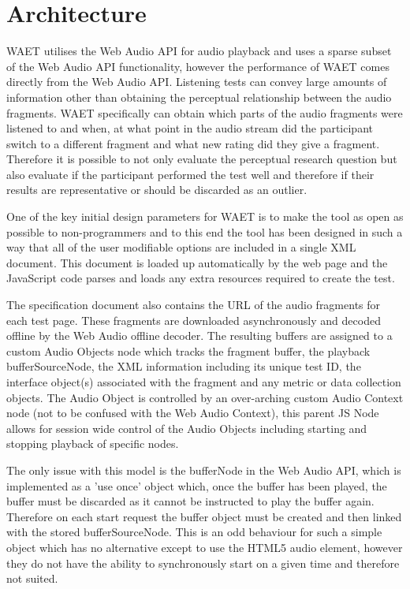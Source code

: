 \documentclass{sig-alternate}
\begin{document}
\section{Architecture}  %
    WAET utilises the Web Audio API for audio playback and uses a sparse subset of the Web Audio API functionality, however the performance of WAET comes directly from the Web Audio API. Listening tests can convey large amounts of information other than obtaining the perceptual relationship between the audio fragments. WAET specifically can obtain which parts of the audio fragments were listened to and when, at what point in the audio stream did the participant switch to a different fragment and what new rating did they give a fragment. Therefore it is possible to not only evaluate the perceptual research question but also evaluate if the participant performed the test well and therefore if their results are representative or should be discarded as an outlier.
    
    One of the key initial design parameters for WAET is to make the tool as open as possible to non-programmers and to this end the tool has been designed in such a way that all of the user modifiable options are included in a single XML document. This document is loaded up automatically by the web page and the JavaScript code parses and loads any extra resources required to create the test.
    
    The specification document also contains the URL of the audio fragments for each test page. These fragments are downloaded asynchronously and decoded offline by the Web Audio offline decoder. The resulting buffers are assigned to a custom Audio Objects node which tracks the fragment buffer, the playback bufferSourceNode, the XML information including its unique test ID, the interface object(s) associated with the fragment and any metric or data collection objects. The Audio Object is controlled by an over-arching custom Audio Context node (not to be confused with the Web Audio Context), this parent JS Node allows for session wide control of the Audio Objects including starting and stopping playback of specific nodes.
    
    The only issue with this model is the bufferNode in the Web Audio API, which is implemented as a 'use once' object which, once the buffer has been played, the buffer must be discarded as it cannot be instructed to play the buffer again. Therefore on each start request the buffer object must be created and then linked with the stored bufferSourceNode. This is an odd behaviour for such a simple object which has no alternative except to use the HTML5 audio element, however they do not have the ability to synchronously start on a given time and therefore not suited.
    
\end{document}
